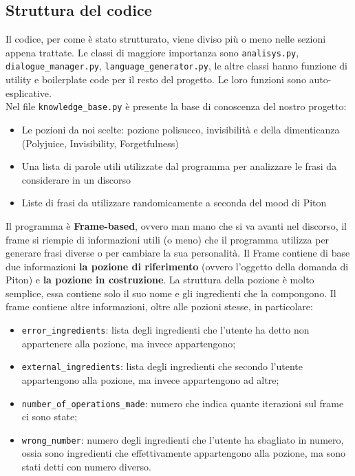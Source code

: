 \subsection{Struttura del codice}
Il codice, per come è stato strutturato, viene diviso più o meno nelle sezioni appena trattate. Le classi di maggiore importanza sono \texttt{analisys.py}, \texttt{dialogue\_manager.py}, \texttt{language\_generator.py}, le altre classi hanno funzione di utility e boilerplate code per il resto del progetto. Le loro funzioni sono auto-esplicative.
\\
Nel file \texttt{knowledge\_base.py} è presente la base di conoscenza del nostro progetto:
\begin{itemize}
    \item Le pozioni da noi scelte: pozione polisucco, invisibilità e della dimenticanza (Polyjuice, Invisibility, Forgetfulness)
    \item Una lista di parole utili utilizzate dal programma per analizzare le frasi da considerare in un discorso
    \item Liste di frasi da utilizzare randomicamente a seconda del mood di Piton
\end{itemize}
Il programma è \textbf{Frame-based}, ovvero man mano che si va avanti nel discorso, il frame si riempie di informazioni utili (o meno) che il programma utilizza per generare frasi diverse o per cambiare la sua personalità. Il Frame contiene di base due informazioni \textbf{la pozione di riferimento} (ovvero l'oggetto della domanda di Piton) e \textbf{la pozione in costruzione}.
La struttura della pozione è molto semplice, essa contiene solo il suo nome e gli ingredienti che la compongono. Il frame contiene altre informazioni, oltre alle pozioni stesse, in particolare:
\begin{itemize}
    \item \texttt{error\_ingredients}: lista degli ingredienti che l'utente ha detto non appartenere alla pozione, ma invece appartengono;
    \item \texttt{external\_ingredients}: lista degli ingredienti che secondo l'utente appartengono alla pozione, ma invece appartengono ad altre;
    \item \texttt{number\_of\_operations\_made}: numero che indica quante iterazioni sul frame ci sono state;
    \item \texttt{wrong\_number}: numero degli ingredienti che l'utente ha sbagliato in numero, ossia sono ingredienti che effettivamente appartengono alla pozione, ma sono stati detti con numero diverso.
\end{itemize}